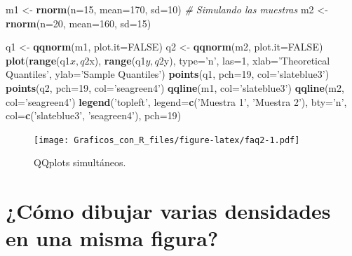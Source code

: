 \documentclass[10pt,]{krantz}
\makeatletter
\newenvironment{Shaded}{\begin{snugshade}}{\end{snugshade}}
\newcommand{\KeywordTok}[1]{\textcolor[rgb]{0.13,0.29,0.53}{\textbf{{#1}}}}
\newcommand{\DataTypeTok}[1]{\textcolor[rgb]{0.13,0.29,0.53}{{#1}}}
\newcommand{\DecValTok}[1]{\textcolor[rgb]{0.00,0.00,0.81}{{#1}}}
\newcommand{\StringTok}[1]{\textcolor[rgb]{0.31,0.60,0.02}{{#1}}}
\newcommand{\CommentTok}[1]{\textcolor[rgb]{0.56,0.35,0.01}{\textit{{#1}}}}
\newcommand{\OtherTok}[1]{\textcolor[rgb]{0.56,0.35,0.01}{{#1}}}
\newcommand{\NormalTok}[1]{{#1}}
\newenvironment{kframe}{%
\medskip{}
\setlength{\fboxsep}{.8em}
 \def\at@end@of@kframe{}%
 \ifinner\ifhmode%
  \def\at@end@of@kframe{\end{minipage}}%
  \begin{minipage}{\columnwidth}%
 \fi\fi%
 \def\FrameCommand##1{\hskip\@totalleftmargin \hskip-\fboxsep
 \colorbox{shadecolor}{##1}\hskip-\fboxsep
     \hskip-\linewidth \hskip-\@totalleftmargin \hskip\columnwidth}%
 \MakeFramed {\advance\hsize-\width
   \@totalleftmargin\z@ \linewidth\hsize
   \@setminipage}}%
 {\par\unskip\endMakeFramed%
 \at@end@of@kframe}
\renewenvironment{Shaded}{\begin{kframe}}{\end{kframe}}
\makeatother
\begin{document}
\begin{Shaded}
\begin{Highlighting}[]
\NormalTok{m1 <-}\StringTok{ }\KeywordTok{rnorm}\NormalTok{(}\DataTypeTok{n=}\DecValTok{15}\NormalTok{, }\DataTypeTok{mean=}\DecValTok{170}\NormalTok{, }\DataTypeTok{sd=}\DecValTok{10}\NormalTok{)  }\CommentTok{# Simulando las muestras}
\NormalTok{m2 <-}\StringTok{ }\KeywordTok{rnorm}\NormalTok{(}\DataTypeTok{n=}\DecValTok{20}\NormalTok{, }\DataTypeTok{mean=}\DecValTok{160}\NormalTok{, }\DataTypeTok{sd=}\DecValTok{15}\NormalTok{)}

\NormalTok{q1 <-}\StringTok{ }\KeywordTok{qqnorm}\NormalTok{(m1, }\DataTypeTok{plot.it=}\OtherTok{FALSE}\NormalTok{)}
\NormalTok{q2 <-}\StringTok{ }\KeywordTok{qqnorm}\NormalTok{(m2, }\DataTypeTok{plot.it=}\OtherTok{FALSE}\NormalTok{)}
\KeywordTok{plot}\NormalTok{(}\KeywordTok{range}\NormalTok{(q1$x, q2$x), }\KeywordTok{range}\NormalTok{(q1$y, q2$y), }\DataTypeTok{type=}\StringTok{'n'}\NormalTok{, }\DataTypeTok{las=}\DecValTok{1}\NormalTok{,}
     \DataTypeTok{xlab=}\StringTok{'Theoretical Quantiles'}\NormalTok{, }\DataTypeTok{ylab=}\StringTok{'Sample Quantiles'}\NormalTok{)}
\KeywordTok{points}\NormalTok{(q1, }\DataTypeTok{pch=}\DecValTok{19}\NormalTok{, }\DataTypeTok{col=}\StringTok{'slateblue3'}\NormalTok{)}
\KeywordTok{points}\NormalTok{(q2, }\DataTypeTok{pch=}\DecValTok{19}\NormalTok{, }\DataTypeTok{col=}\StringTok{'seagreen4'}\NormalTok{)}
\KeywordTok{qqline}\NormalTok{(m1, }\DataTypeTok{col=}\StringTok{'slateblue3'}\NormalTok{)}
\KeywordTok{qqline}\NormalTok{(m2, }\DataTypeTok{col=}\StringTok{'seagreen4'}\NormalTok{)}
\KeywordTok{legend}\NormalTok{(}\StringTok{'topleft'}\NormalTok{, }\DataTypeTok{legend=}\KeywordTok{c}\NormalTok{(}\StringTok{'Muestra 1'}\NormalTok{, }\StringTok{'Muestra 2'}\NormalTok{), }\DataTypeTok{bty=}\StringTok{'n'}\NormalTok{,}
       \DataTypeTok{col=}\KeywordTok{c}\NormalTok{(}\StringTok{'slateblue3'}\NormalTok{, }\StringTok{'seagreen4'}\NormalTok{), }\DataTypeTok{pch=}\DecValTok{19}\NormalTok{)}
\end{Highlighting}
\end{Shaded}

\begin{figure}[htbp]
\centering
\texttt{[image: Graficos\_con\_R\_files/figure-latex/faq2-1.pdf]}
\caption{\label{fig:faq2}QQplots simultáneos.}
\end{figure}

\section{¿Cómo dibujar varias densidades en una misma
figura?}\label{como-dibujar-varias-densidades-en-una-misma-figura}
\end{document}
